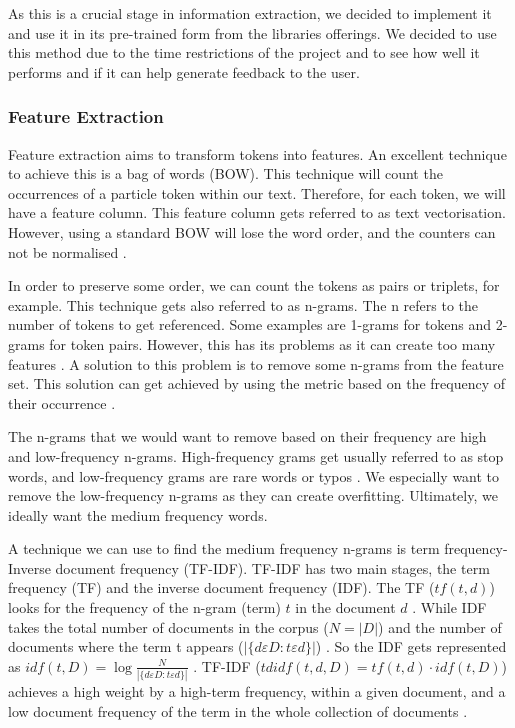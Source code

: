 	As this is a crucial stage in information extraction, we decided to implement it and use it in its pre-trained form from the libraries offerings. We decided to use this method due to the time restrictions of the project and to see how well it performs and if it can help generate feedback to the user.
	
	
	\subsubsection{Feature Extraction}
	Feature extraction aims to transform tokens into features. An excellent technique to achieve this is a bag of words (BOW). This technique will count the occurrences of a particle token within our text. Therefore, for each token, we will have a feature column. This feature column gets referred to as text vectorisation. However, using a standard BOW will lose the word order, and the counters can not be normalised \cite{hapke2019natural}. 
	
	In order to preserve some order, we can count the tokens as pairs or triplets, for example. This technique gets also referred to as n-grams. The n refers to the number of tokens to get referenced. Some examples are 1-grams for tokens and 2-grams for token pairs. However, this has its problems as it can create too many features \cite{vajjala2020practical}. A solution to this problem is to remove some n-grams from the feature set. This solution can get achieved by using the metric based on the frequency of their occurrence \cite{vajjala2020practical}.
	
	The n-grams that we would want to remove based on their frequency are high and low-frequency n-grams. High-frequency grams get usually referred to as stop words, and low-frequency grams are rare words or typos \cite{hapke2019natural}. We especially want to remove the low-frequency n-grams as they can create overfitting. Ultimately, we ideally want the medium frequency words.
	
	A technique we can use to find the medium frequency n-grams is term frequency-Inverse document frequency (TF-IDF). TF-IDF has two main stages, the term frequency (TF) and the inverse document frequency (IDF). The TF ($tf(t,d)$) looks for the frequency of the n-gram (term) $t$ in the document $d$ \cite{sarkar2016text}. While IDF takes the total number of documents in the corpus ($N = |D|$) and the number of documents where the term t appears ($|\{d \varepsilon D:t \varepsilon d\}|$) \cite{sarkar2016text}. So the IDF gets represented as $idf(t,D) = \log\frac{N}{|\{d \varepsilon D:t \varepsilon d\}|}$ \cite{sarkar2016text}. TF-IDF ($tdidf(t,d,D) = tf(t,d) \cdot idf(t,D)$) achieves a high weight by a high-term frequency, within a given document, and a low  document frequency of the term in the whole collection of documents \cite{sarkar2016text}.
	
